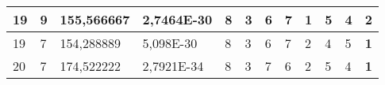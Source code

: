 \documentclass[conference]{IEEEtran}
\begin{document}
\begin{table*}[]
\begin{tabular}{|llll|llllllll|}
\multicolumn{1}{|l|}{19}                                                    & \multicolumn{1}{l|}{9}                                                        & \multicolumn{1}{l|}{155,566667}                                                   & 2,7464E-30                     & \multicolumn{1}{l|}{8}                                                  & \multicolumn{1}{l|}{3}                                                  & \multicolumn{1}{l|}{6}                                                  & \multicolumn{1}{l|}{7}                                                  & \multicolumn{1}{l|}{\textbf{1}}                                         & \multicolumn{1}{l|}{5}                                                  & \multicolumn{1}{l|}{4}                                                  & 2                          \\ \hline
\multicolumn{1}{|l|}{19}                                                    & \multicolumn{1}{l|}{7}                                                        & \multicolumn{1}{l|}{154,288889}                                                   & 5,098E-30                      & \multicolumn{1}{l|}{8}                                                  & \multicolumn{1}{l|}{3}                                                  & \multicolumn{1}{l|}{6}                                                  & \multicolumn{1}{l|}{7}                                                  & \multicolumn{1}{l|}{2}                                                  & \multicolumn{1}{l|}{4}                                                  & \multicolumn{1}{l|}{5}                                                  & \textbf{1}                 \\ \hline
\multicolumn{1}{|l|}{20}                                                    & \multicolumn{1}{l|}{7}                                                        & \multicolumn{1}{l|}{174,522222}                                                   & 2,7921E-34                     & \multicolumn{1}{l|}{8}                                                  & \multicolumn{1}{l|}{3}                                                  & \multicolumn{1}{l|}{7}                                                  & \multicolumn{1}{l|}{6}                                                  & \multicolumn{1}{l|}{2}                                                  & \multicolumn{1}{l|}{5}                                                  & \multicolumn{1}{l|}{4}                                                  & \textbf{1}                 \\ \hline

\end{tabular}
\end{table*}
\end{document}
